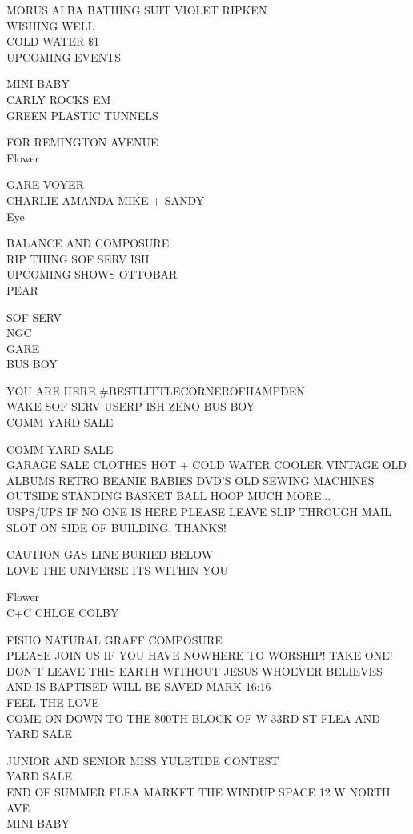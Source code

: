 \documentclass[10pt,letterpaper]{article}
\begin{document}
MORUS ALBA BATHING SUIT VIOLET RIPKEN\\
WISHING WELL\\
COLD WATER \$1\\
UPCOMING EVENTS

MINI BABY\\
CARLY ROCKS EM\\
GREEN PLASTIC TUNNELS

FOR REMINGTON AVENUE\\
Flower

GARE VOYER\\
CHARLIE AMANDA MIKE + SANDY\\
Eye

BALANCE AND COMPOSURE\\
RIP THING SOF SERV ISH\\
UPCOMING SHOWS OTTOBAR\\
PEAR

SOF SERV\\
NGC\\
GARE\\
BUS BOY

YOU ARE HERE \#BESTLITTLECORNEROFHAMPDEN\\
WAKE SOF SERV USERP ISH ZENO BUS  BOY\\
COMM YARD SALE

COMM YARD SALE\\
GARAGE SALE CLOTHES HOT + COLD WATER COOLER VINTAGE OLD ALBUMS RETRO BEANIE BABIES DVD'S OLD SEWING MACHINES OUTSIDE STANDING BASKET BALL HOOP MUCH MORE...\\
USPS/UPS IF NO ONE IS HERE PLEASE LEAVE SLIP THROUGH MAIL SLOT ON SIDE OF BUILDING.  THANKS!

CAUTION GAS LINE BURIED BELOW\\
LOVE THE UNIVERSE ITS WITHIN YOU

Flower\\
C+C CHLOE COLBY

FISHO NATURAL GRAFF COMPOSURE\\
PLEASE JOIN US IF YOU HAVE NOWHERE TO WORSHIP!  TAKE ONE!  DON'T LEAVE THIS EARTH WITHOUT JESUS WHOEVER BELIEVES AND IS BAPTISED WILL BE SAVED MARK 16:16\\
FEEL THE LOVE\\
COME ON DOWN TO THE 800TH BLOCK OF W 33RD ST FLEA AND YARD SALE

JUNIOR AND SENIOR MISS YULETIDE CONTEST\\
YARD SALE\\
END OF SUMMER FLEA MARKET THE WINDUP SPACE 12 W NORTH AVE\\
MINI BABY
\end{document}
